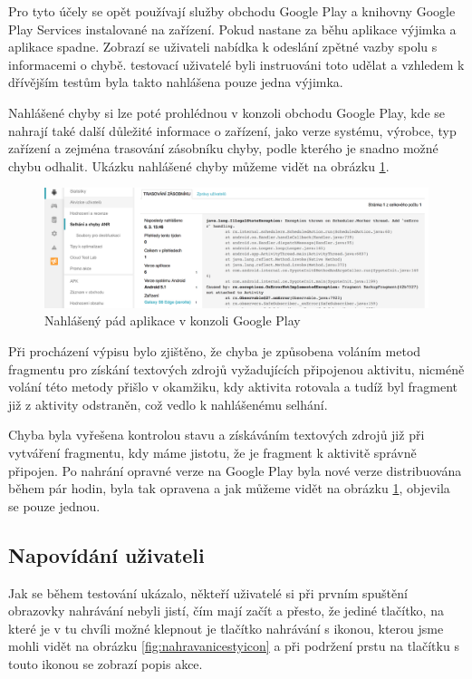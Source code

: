 \documentclass[czech,master,public,dept460,male,java,cpdeclaration]{diploma}
\begin{document}
 Pro tyto účely se opět používají služby obchodu Google Play a knihovny Google Play Services instalované
 na zařízení. Pokud nastane za běhu aplikace výjimka a aplikace spadne. Zobrazí se uživateli nabídka
 k odeslání zpětné vazby spolu s informacemi o chybě. testovací uživatelé byli instruováni toto udělat
 a vzhledem k dřívějším testům byla takto nahlášena pouze jedna výjimka.

 Nahlášené chyby si lze poté prohlédnou v konzoli obchodu Google Play, kde se nahrají také další
 důležité informace o zařízení, jako verze systému, výrobce, typ zařízení a zejména trasování zásobníku
 chyby, podle kterého je snadno možné chybu odhalit. Ukázku nahlášené chyby můžeme vidět na obrázku
 \ref{fig:anr}.

   \begin{figure}[H]
               \centering
                       \includegraphics[scale=0.7]{img/anr.png}
               \caption{Nahlášený pád aplikace v konzoli Google Play}
               \label{fig:anr}
       \end{figure}

Při procházení výpisu bylo zjištěno, že chyba je způsobena voláním metod fragmentu pro získání textových zdrojů
 vyžadujících připojenou aktivitu, nicméně volání této metody přišlo v okamžiku, kdy aktivita rotovala
a tudíž byl fragment již z aktivity odstraněn, což vedlo k nahlášenému selhání.

Chyba byla vyřešena kontrolou stavu a získáváním textových zdrojů již při vytváření fragmentu,
kdy máme jistotu, že je fragment k aktivitě správně připojen. Po nahrání opravné verze na Google Play
byla nové verze distribuována během pár hodin, byla tak opravena a jak můžeme vidět na obrázku
\ref{fig:anr}, objevila se pouze jednou.

\subsection{Napovídání uživateli}
Jak se během testování ukázalo, někteří uživatelé si při prvním spuštění obrazovky nahrávání nebyli
 jistí, čím mají začít a přesto, že jediné tlačítko, na které je v tu chvíli možné klepnout je
 tlačítko nahrávání s ikonou, kterou jsme mohli vidět na obrázku \ref{fig:nahravanicestyicon}
 a při podržení prstu na tlačítku s touto ikonou se zobrazí popis akce.
\end{document}
